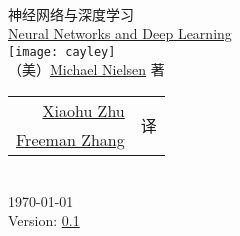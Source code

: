 
\begin{titlepage}
\begin{center}
  \hfill\\
  \vspace{1cm}
  {\fontsize{36pt}{40pt}\NotoSansSCBold{} 神经网络与深度学习}\\
  \vspace{1em}
  {\LARGE\RobotoRegular{} \href{http://neuralnetworksanddeeplearning.com/index.html}{Neural Networks and Deep Learning}}\\
  \vspace{1cm}
  \texttt{[image: cayley]}\\
  \vspace{1cm}
  {\LARGE （美）\href{http://michaelnielsen.org/}{Michael Nielsen} 著}\\
  \vspace{1cm}
  {\Large
    \begin{tabular}{rl}
      \href{mailto:xhzhu.nju@gmail}{Xiaohu Zhu} & \multirow{2}{*}{译} \\
      \href{mailto:zhanggyb@gmail.com}{Freeman Zhang} & \\
    \end{tabular}
  }\\
  \vfill
  {\large \today}\\
  \vspace{1em}
  {\large Version: \href{https://github.com/zhanggyb/nndl/releases/tag/0.1}{0.1}}
\end{center}
\end{titlepage}


